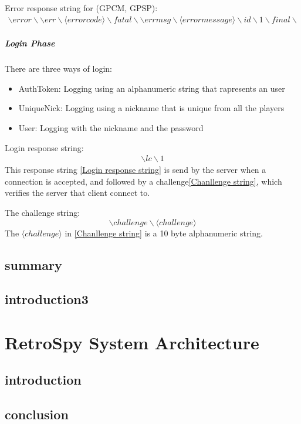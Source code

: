 \documentclass[oneside,titlepage,a4paper]{report} %
\begin{document}
Error response string for (GPCM, GPSP):
\begin{equation}
\begin{split}
\backslash error \backslash\backslash err \backslash \langle error code \rangle \backslash fatal\backslash\backslash errmsg \backslash \langle error message \rangle \backslash id\backslash 1 \backslash final \backslash
\end{split}	
\end{equation}
\subsubsection{Login Phase}
There are three ways of login:
\begin{itemize}
	\item AuthToken: Logging using an alphanumeric string that rapresents an user
	\item 	UniqueNick: Logging using a nickname that is unique from all the players
	\item User: Logging with the nickname and the password
\end{itemize}


Login response string: 
\begin{equation}\label{Login response string}
	\begin{split}
		\backslash lc \backslash 1
	\end{split}	
\end{equation}
This response string \ref{Login response string} is send by the server when a connection is accepted, and followed by a challenge\ref{Chanllenge string}, which verifies the server that client connect to.

The challenge string:
\begin{equation}\label{Chanllenge string}
	\backslash challenge \backslash \langle challenge \rangle
\end{equation}
The $ \langle challenge \rangle $ in \ref{Chanllenge string} is a 10 byte alphanumeric string.
\chapter{summary}

\chapter{introduction3}

\part{RetroSpy System Architecture}

\chapter{introduction}

\chapter{conclusion}
\end{document}
